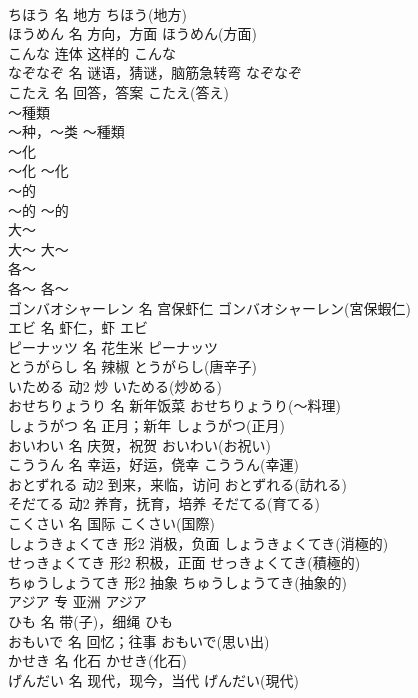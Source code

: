 \documentclass[8pt]{extreport}
\begin{document}
\begin{CJK}{UTF8}{min}
\\	ちほう	名	地方	ちほう(地方)	
\\	ほうめん	名	方向，方面	ほうめん(方面)	
\\	こんな	连体	这样的	こんな	
\\	なぞなぞ	名	谜语，猜谜，脑筋急转弯	なぞなぞ	
\\	こたえ	名	回答，答案	こたえ(答え)	
\\	～種類	
\\	～种，～类	～種類	
\\	～化	
\\	～化	～化	
\\	～的	
\\	～的	～的	
\\	大～	
\\	大～	大～	
\\	各～	
\\	各～	各～	
\\	ゴンバオシャーレン	名	宫保虾仁	ゴンバオシャーレン(宮保蝦仁)	
\\	エビ	名	虾仁，虾	エビ	
\\	ピーナッツ	名	花生米	ピーナッツ	
\\	とうがらし	名	辣椒	とうがらし(唐辛子)	
\\	いためる	动2	炒	いためる(炒める)	
\\	おせちりょうり	名	新年饭菜	おせちりょうり(～料理)	
\\	しょうがつ	名	正月；新年	しょうがつ(正月)	
\\	おいわい	名	庆贺，祝贺	おいわい(お祝い)	
\\	こううん	名	幸运，好运，侥幸	こううん(幸運)	
\\	おとずれる	动2	到来，来临，访问	おとずれる(訪れる)	
\\	そだてる	动2	养育，抚育，培养	そだてる(育てる)	
\\	こくさい	名	国际	こくさい(国際)	
\\	しょうきょくてき	形2	消极，负面	しょうきょくてき(消極的)	
\\	せっきょくてき	形2	积极，正面	せっきょくてき(積極的)	
\\	ちゅうしょうてき	形2	抽象	ちゅうしょうてき(抽象的)	
\\	アジア	专	亚洲	アジア	
\\	ひも	名	带(子)，细绳	ひも	
\\	おもいで	名	回忆；往事	おもいで(思い出)	
\\	かせき	名	化石	かせき(化石)	
\\	げんだい	名	现代，现今，当代	げんだい(現代)	

\end{CJK}
\end{document}
